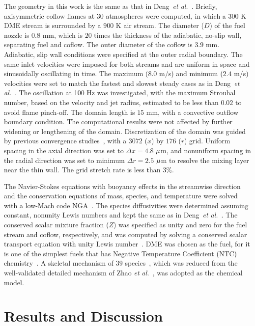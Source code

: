 \documentclass{essci}
\begin{document}
The geometry in this work is the same as that in Deng~\emph{et al.}~\cite{deng15b}.  Briefly, axisymmetric coflow flames at $30$ atmospheres were computed, in which a $300$ K DME stream is surrounded by a $900$ K air stream.  The diameter ($D$) of the fuel nozzle is $0.8$ mm, which is $20$ times the thickness of the adiabatic, no-slip wall, separating fuel and coflow.  The outer diameter of the coflow is $3.9$ mm.  Adiabatic, slip wall conditions were specified at the outer radial boundary.  The same inlet velocities were imposed for both streams and are uniform in space and sinusoidally oscillating in time.  The maximum ($8.0$ m/s) and minimum ($2.4$ m/s) velocities were set to match the fastest and slowest steady cases as in Deng~\emph{et al.}~\cite{deng15b}.  The oscillation at 100 Hz was investigated, with the maximum Strouhal number, based on the velocity and jet radius, estimated to be less than $0.02$ to avoid flame pinch-off.  The domain length is $15$ mm, with a convective outflow boundary condition.  The computational results were not affected by further widening or lengthening of the domain.  Discretization of the domain was guided by previous convergence studies~\cite{deng15}, with a $3072$ ($x$) by $176$ ($r$) grid.  Uniform spacing in the axial direction was set to $\Delta x = 4.8$ ${\rm \mu}$m, and nonuniform spacing in the radial direction was set to minimum $\Delta r = 2.5$ ${\rm \mu}$m to resolve the mixing layer near the thin wall.  The grid stretch rate is less than $3$\%.

The Navier-Stokes equations with buoyancy effects in the streamwise direction and the conservation equations of mass, species, and temperature were solved with a low-Mach code NGA~\cite{desjardins08}.  The species diffusivities were determined assuming constant, nonunity Lewis numbers and kept the same as in Deng~\emph{et al.}~\cite{deng15}.  The conserved scalar mixture fraction ($Z$) was specified as unity and zero for the fuel stream and coflow, respectively, and was computed by solving a conserved scalar transport equation with unity Lewis number~\cite{pitsch98b}.  DME was chosen as the fuel, for it is one of the simplest fuels that has Negative Temperature Coefficient (NTC) chemistry~\cite{deng14}.  A skeletal mechanism of $39$ species~\cite{bhagatwala15}, which was reduced from the well-validated detailed mechanism of Zhao \emph{et al.}~\cite{zhao08}, was adopted as the chemical model.

\section{Results and Discussion}
\end{document}
